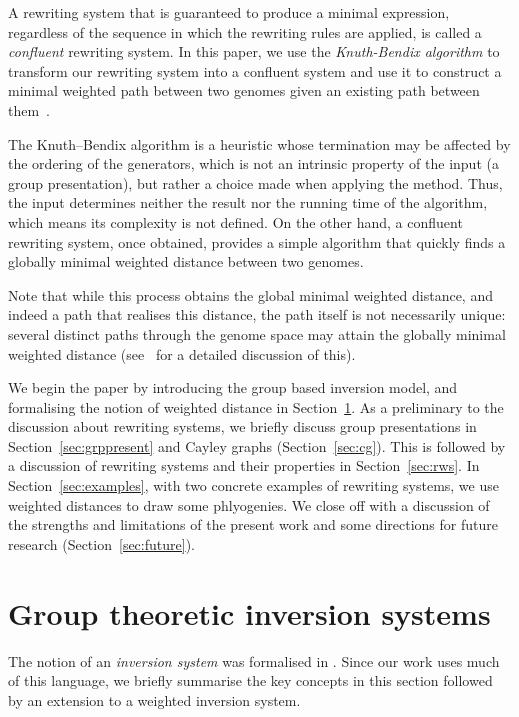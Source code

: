 \documentclass[12pt,a4paper]{amsart}
\numberwithin{equation}{section}
\begin{document}
A rewriting system that is guaranteed to produce a minimal expression, regardless of the sequence in which the rewriting rules are applied, is called a \emph{confluent} rewriting system.  In this paper, we use the \emph{Knuth-Bendix algorithm}  to transform our rewriting system into a confluent system and use it to construct a minimal weighted path between two genomes given an existing path between them~\citep{knuth1983simple}.

The Knuth--Bendix algorithm is a heuristic whose termination may be affected by the ordering of the generators, which is not an intrinsic property of the input (a group presentation), but rather a choice made when applying the method.  Thus, the input determines neither the result nor the running time of the algorithm, which means its complexity is not defined.  On the other hand, a confluent rewriting system, once obtained, provides a simple algorithm that quickly finds a globally minimal weighted distance between two genomes.  

Note that while this process obtains the global minimal weighted distance, and indeed a path that realises this distance, the path itself is not necessarily unique: several distinct paths through the genome space may attain the globally minimal weighted distance (see~\cite{clark2019bacterial} for a detailed discussion of this).  

We begin the paper by introducing the group based inversion model, and formalising the notion of weighted distance in Section~\ref{subs:invsys}. As a preliminary to the discussion about rewriting systems, we briefly discuss group presentations in Section~\ref{sec:grppresent} and Cayley graphs (Section~\ref{sec:cg}). This is followed by a discussion of rewriting systems and their properties in Section~\ref{sec:rws}. In Section~\ref{sec:examples}, with two concrete examples of rewriting systems, we use weighted distances to draw some phlyogenies. We close off with a discussion of the strengths and limitations of the present work and some directions for future research (Section~\ref{sec:future}).


\section[Inversion systems]{Group theoretic inversion systems}\label{subs:invsys}

The notion of an \emph{inversion system} was formalised in \citet{egrinagy2013group}. Since our work uses much of this language, we briefly summarise the key concepts in this section followed by an extension to a weighted inversion system.  
\end{document}
